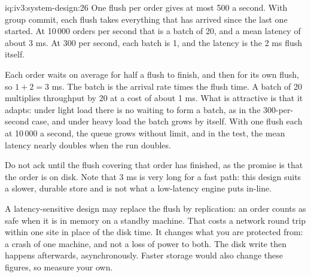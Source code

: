\begin{solution}{iq:iv3:system-design:26}
One flush per order gives at most 500 a second. With group commit, each flush takes everything that has arrived since the last one started. At 10\,000 orders per second that is a batch of 20, and a mean latency of about 3 ms. At 300 per second, each batch is 1, and the latency is the 2 ms flush itself.
\enlargethispage{-3\baselineskip}%
\label{lst:iv3:sd:group}

Each order waits on average for half a flush to finish, and then for its own flush, so $1 + 2 = 3$ ms. The batch is the arrival rate times the flush time. A batch of 20 multiplies throughput by 20 at a cost of about 1 ms. What is attractive is that it adapts: under light load there is no waiting to form a batch, as in the 300-per-second case, and under heavy load the batch grows by itself. With one flush each at 10\,000 a second, the queue grows without limit, and in the test, the mean latency nearly doubles when the run doubles.

Do not ack until the flush covering that order has finished, as the promise is that the order is on disk. Note that 3 ms is very long for a fast path: this design suits a slower, durable store and is not what a low-latency engine puts in-line.

A latency-sensitive design may replace the flush by replication: an order counts as safe when it is in memory on a standby machine. That costs a network round trip within one site in place of the disk time. It changes what you are protected from: a crash of one machine, and not a loss of power to both. The disk write then happens afterwards, asynchronously. Faster storage would also change these figures, so measure your own.

\end{solution}

